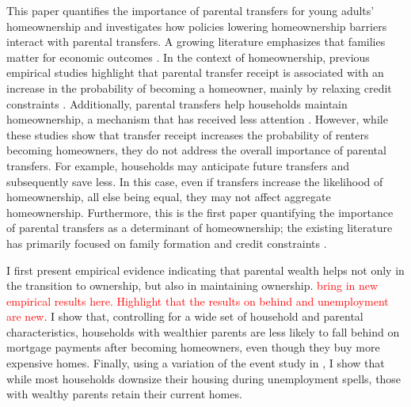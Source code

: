 \documentclass[12pt]{article}
\begin{document}
This paper quantifies the importance of parental transfers for young adults' homeownership and investigates how policies lowering homeownership barriers interact with parental transfers. A growing literature emphasizes that families matter for economic outcomes \citep{Doepke2016a}. In the context of homeownership, previous empirical studies highlight that parental transfer receipt is associated with an increase in the probability of becoming a homeowner, mainly by relaxing credit constraints \citep[see e.g.,][]{Lee2018,Blickle2019,wold2024housing}. Additionally, parental transfers help households maintain homeownership, a mechanism that has received less attention \citep[see e.g.,][]{bond2021role}. However, while these studies show that transfer receipt increases the probability of renters becoming homeowners, they do not address the overall importance of parental transfers. For example, households may anticipate future transfers and subsequently save less. In this case, even if transfers increase the likelihood of homeownership, all else being equal, they may not affect aggregate homeownership. Furthermore, this is the first paper quantifying the importance of parental transfers as a determinant of homeownership; the existing literature has primarily focused on family formation and credit constraints \citep[see e.g.,][]{Chang2024,Paz-Pardo2019,Mabille2020}.

I first present empirical evidence indicating that parental wealth helps not only in the transition to ownership, but also in maintaining ownership. \textcolor{red}{bring in new empirical results here. Highlight that the results on behind and unemployment are new}. I show that, controlling for a wide set of household and parental characteristics, households with wealthier parents are less likely to fall behind on mortgage payments after becoming homeowners, even though they buy more expensive homes. Finally, using a variation of the event study in \cite{Chetty2007}, I show that while most households downsize their housing during unemployment spells, those with wealthy parents retain their current homes.
\end{document}
